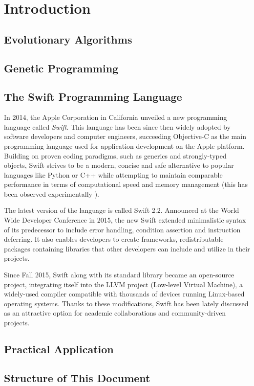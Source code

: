 \chapter{Introduction}

\section{Evolutionary Algorithms}
\todo

\section{Genetic Programming}
\todo

\section{The Swift Programming Language}
In 2014, the Apple Corporation in California unveiled a new programming language called \textit{Swift}. \cite{SwiftReference} This language has been since then widely adopted by software developers and computer engineers, succeeding Objective-C as the main programming language used for application development on the Apple platform. Building on proven coding paradigms, such as generics and strongly-typed objects, Swift strives to be a modern, concise and safe alternative to popular languages like Python or C++ while attempting to maintain comparable performance in terms of computational speed and memory management (this has been observed experimentally \cite{PrimateLabsBenchmark}).

The latest version of the language is called Swift 2.2. Announced at the World Wide Developer Conference in 2015, the new Swift extended minimalistic syntax of its predecessor to include error handling, condition assertion and instruction deferring. It also enables developers to create frameworks, redistributable packages containing libraries that other developers can include and utilize in their projects.

Since Fall 2015, Swift along with its standard library became an open-source project, integrating itself into the LLVM project (Low-level Virtual Machine), a widely-used compiler compatible with thousands of devices running Linux-based operating systems. Thanks to these modifications, Swift has been lately discussed as an attractive option for academic collaborations and community-driven projects.

\section{Practical Application}
\todo

\section{Structure of This Document}
\todo
